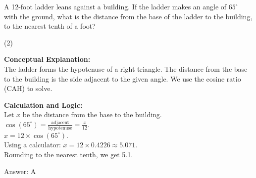\documentclass[11pt,paper=a4,answers]{exam}
\begin{document}
\begin{questions}
\pointsinrightmargin
\pointsdroppedatright
\marksnotpoints
{}
\pointformat{\boldmath\themarginpoints}
\bracketedpoints


\question
A 12-foot ladder leans against a building. If the ladder makes an angle of $65^\circ$ with the ground, what is the distance from the base of the ladder to the building, to the nearest tenth of a foot?
\begin{center}
\end{center}
\begin{tasks}(2)
\end{tasks}

\begin{solution}
\textbf{Conceptual Explanation:} \\
The ladder forms the hypotenuse of a right triangle. The distance from the base to the building is the side adjacent to the given angle. We use the cosine ratio (CAH) to solve.

\vspace{10pt}
\textbf{Calculation and Logic:} \\
Let $x$ be the distance from the base to the building. \\
$\cos(65^\circ) = \frac{\text{adjacent}}{\text{hypotenuse}} = \frac{x}{12}$. \\
$x = 12 \times \cos(65^\circ)$. \\
Using a calculator: $x = 12 \times 0.4226 \approx 5.071$. \\
Rounding to the nearest tenth, we get 5.1.

\vspace{15pt}
Answer: \colorbox{yellow!100}{A}
\end{solution}


\end{questions}
\end{document}
